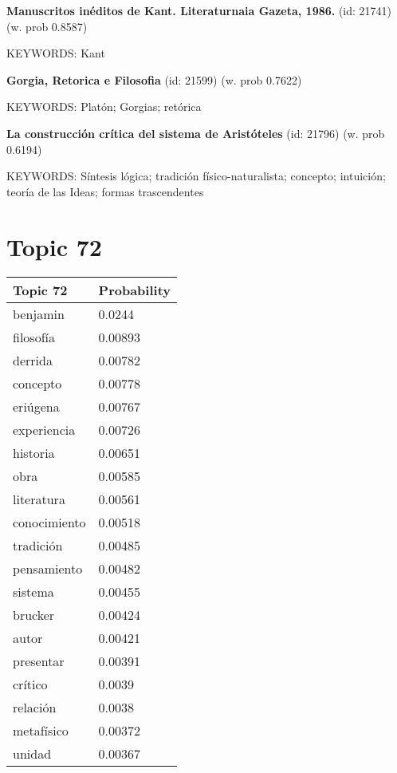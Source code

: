 \documentclass{article}
\begin{document}
\textbf{Manuscritos inéditos de Kant. Literaturnaia Gazeta, 1986.} (id: 21741)
 (w. prob 0.8587)


KEYWORDS:
Kant
\vfill

\textbf{Gorgia, Retorica e Filosofia} (id: 21599)
 (w. prob 0.7622)


KEYWORDS:
Platón; Gorgias; retórica
\vfill

\textbf{La construcción crítica del sistema de Aristóteles} (id: 21796)
 (w. prob 0.6194)


KEYWORDS:
Síntesis lógica; tradición físico-naturalista; concepto; intuición; teoría de las Ideas; formas trascendentes

\vfill
\newpage


\centering
\thispagestyle{empty}
\section*{Topic 72}\vfill
\begin{tabular}{ll}
\toprule
     Topic 72 & Probability \\
\midrule
     benjamin &      0.0244 \\
    filosofía &     0.00893 \\
      derrida &     0.00782 \\
     concepto &     0.00778 \\
     eriúgena &     0.00767 \\
  experiencia &     0.00726 \\
     historia &     0.00651 \\
         obra &     0.00585 \\
   literatura &     0.00561 \\
 conocimiento &     0.00518 \\
    tradición &     0.00485 \\
  pensamiento &     0.00482 \\
      sistema &     0.00455 \\
      brucker &     0.00424 \\
        autor &     0.00421 \\
    presentar &     0.00391 \\
      crítico &      0.0039 \\
     relación &      0.0038 \\
   metafísico &     0.00372 \\
       unidad &     0.00367 \\
\bottomrule
\end{tabular}
\end{document}
